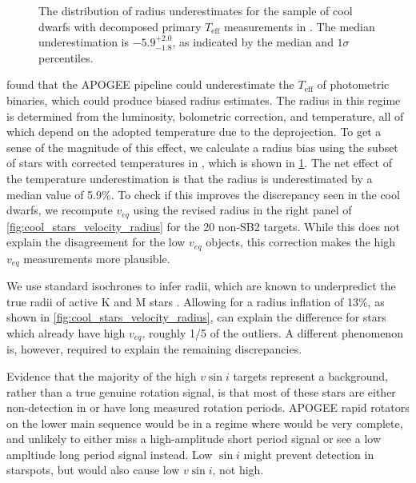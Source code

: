 \documentclass[preprint2]{aastex62}
\newcommand{\vsini}{\ensuremath{v \sin i}}
\newcommand{\Teff}{\ensuremath{T_{\textrm{eff}}}}
\begin{document}
\begin{figure}[htb]
    \centering
    \caption{The distribution of radius underestimates for the sample of cool 
        dwarfs with decomposed primary \Teff{} measurements in 
        \citet{ElBadry18b}. The median underestimation is
    \(-5.9^{+2.0}_{-1.8}\), as indicated by the median and \(1\sigma\)
percentiles.}
    \label{fig:radiusbias}
\end{figure}

\citet{ElBadry18a} found that the APOGEE pipeline could underestimate the
\Teff{} of photometric binaries, which could produce biased radius estimates. 
The radius in this regime is determined from the
luminosity, bolometric correction, and temperature, all of which depend on the
adopted temperature due to the deprojection. To get a sense of the magnitude of
this effect, we calculate a radius bias using the subset of stars with
corrected temperatures in \citet{ElBadry18b}, which is shown in 
\cref{fig:radiusbias}.
The net effect of the temperature underestimation is that the radius is
underestimated by a median value of 5.9\%. To check if this improves the 
discrepancy seen in the cool dwarfs, we recompute \(v_{eq}\) using the revised 
radius in the right panel of \cref{fig:cool_stars_velocity_radius} for the 20 
non-SB2 targets.  While this does not explain the disagreement for the
low \(v_{eq}\) objects, this correction makes the high \(v_{eq}\) measurements
more plausible. 

We use standard isochrones to infer radii, which are known to underpredict the
true radii of active K and M stars \citep{Jackson14a}. Allowing for a radius 
inflation of 13\%, as shown in \cref{fig:cool_stars_velocity_radius}, can explain the
difference for stars which already have high \(v_{eq}\), roughly 1/5 of the
outliers. A different phenomenon is, however, required to explain the remaining
discrepancies.

Evidence that the majority of the high \vsini{} targets represent a background, 
rather than a true genuine rotation signal, is that most of these stars are 
either non-detection in
\citet{McQuillan14} or have long measured rotation periods. APOGEE rapid
rotators on the lower main sequence would be in a regime where
\citet{McQuillan14} would be very complete, and unlikely to either miss a
high-amplitude short period signal or see a low ampltiude long period signal
instead. Low \(\sin i\) might prevent 
detection in starspots, but would also cause low \vsini{}, not high.
\end{document}
